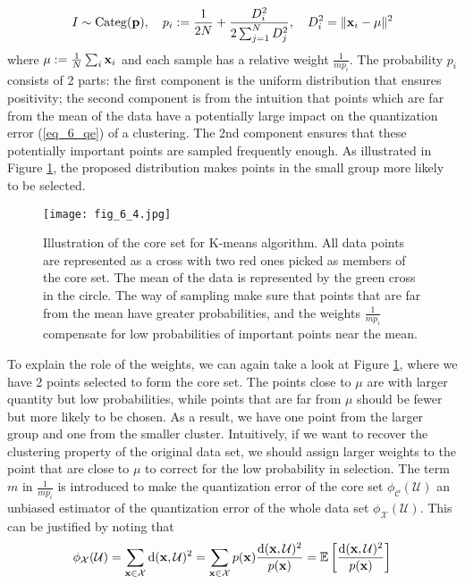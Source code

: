 \documentclass[../book-template.tex]{subfiles}
\begin{document}
\begin{equation*}
	I\sim {\rm Categ}({\bf p}),\quad p_i:=\frac{1}{2N}+\frac{D_i^2}{2\sum_{j=1}^N D_j^2},\quad D_i^2=\|{\bf x}_i-\mu\|^2
\end{equation*}
where $\mu:=\frac{1}{N}\sum_i {\bf x}_i$ and each sample has a relative weight $\frac{1}{mp_i}$. The probability $p_i$ consists of 2 parts: the first component is the uniform distribution that ensures positivity; the second component is from the intuition that points which are far from the mean of the data have a potentially large impact on the quantization error (\ref{eq_6_qe}) of a clustering. The 2nd component ensures that these potentially important points are sampled frequently enough. As illustrated in Figure \ref{fig_6_4}, the proposed distribution makes points in the small group more likely to be selected.
\begin{figure}[t] 
	\centering 
	\texttt{[image: fig\_6\_4.jpg]} 
	\caption{Illustration of the core set for K-means algorithm. All data points are represented as a cross with two red ones picked as members of the core set. The mean of the data is represented by the green cross in the circle. The way of sampling make sure that points that are far from the mean have greater probabilities, and the weights $\frac{1}{mp_i}$ compensate for low probabilities of important points near the mean.}\label{fig_6_4}
\end{figure}
\par To explain the role of the weights, we can again take a look at Figure \ref{fig_6_4}, where we have 2 points selected to form the core set. The points close to $\mu$ are with larger quantity but low probabilities, while points that are far from $\mu$ should be fewer but more likely to be chosen. As a result, we have one point from the larger group and one from the smaller cluster. Intuitively, if we want to recover the clustering property of the original data set, we should assign larger weights to the point that are close to $\mu$ to correct for the low probability in selection. The term $m$ in $\frac{1}{mp_i}$ is introduced to make the quantization error of the core set $\phi_{\mathcal{C}}(\mathcal{U})$ an unbiased estimator of the quantization error of the whole data set $\phi_{\mathcal{X}}(\mathcal{U})$. This can be justified by noting that
\begin{equation*}
	\phi_{\mathcal{X}}(\mathcal{U}) = \sum_{{\bf x}\in \mathcal{X}}{\rm d}({\bf x}, \mathcal{U})^2 = \sum_{{\bf x}\in \mathcal{X}}p({\bf x})\frac{{\rm d}({\bf x}, \mathcal{U})^2}{p({\bf x})} = \mathbb{E}\left[\frac{{\rm d}({\bf x}, \mathcal{U})^2}{p({\bf x})}\right]
\end{equation*}
\end{document}
